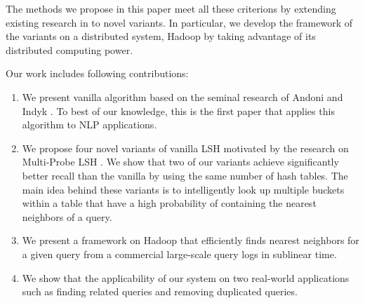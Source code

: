 The methods we propose in this paper meet all these criterions by extending existing research in \lshf 
\cite{Indyk98STOC,Charikar02STOC,Andoni06FOCS,Andoni08CACM}  to novel variants. 
In particular, we develop the framework of  the variants on a distributed 
system, Hadoop by taking advantage of its distributed computing power.

Our work includes following contributions: 
\begin{enumerate}
\item We present vanilla \lsh algorithm based on the seminal research of Andoni and Indyk  . To best of our knowledge, this is the first paper that applies this algorithm to NLP applications. 
\item We propose four novel variants of vanilla LSH motivated by the research on Multi-Probe LSH \cite{LvVLDB07}.  We show that two of our variants achieve significantly better recall than the vanilla \lsh by using the same number of hash tables. The main idea behind these variants is to intelligently look up multiple buckets within a table that have a high probability of containing the nearest neighbors of a query.  
\item We present a framework on Hadoop that efficiently finds nearest neighbors for a given query from a commercial large-scale query logs in sublinear time. %
\item  We show that the applicability of our system on two real-world applications such as finding related queries and removing duplicated queries.
\end{enumerate}


